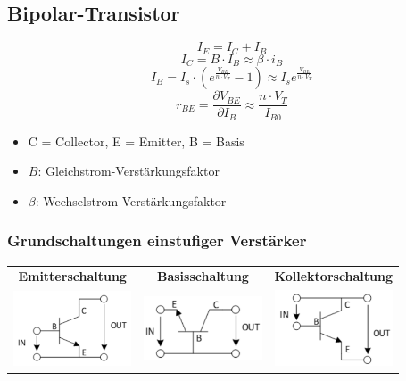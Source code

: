 \documentclass[margin=normal]{tex/hsrzf}
\begin{document}
\begin{multicols*}{2}
  
  
  \subsection{Bipolar-Transistor}
  $$I_E = I_C+I_B$$
  $$I_C = B\cdot I_B \approx \beta \cdot i_B$$
  $$I_B= I_s \cdot(e^{\frac{V_{BE}}{n \cdot V_T}}-1) \approx I_s e^{\frac{V_{BE}}{n \cdot V_T}}$$
  $$r_{BE} = \frac{\partial V_{BE}}{\partial I_B} \approx \frac{n \cdot V_T}{I_{B0}} $$
  {\tiny \begin{itemize}[leftmargin=*]
    \item C = Collector, E = Emitter, B = Basis
      \item $B$: Gleichstrom-Verstärkungsfaktor
      \item $\beta$: Wechselstrom-Verstärkungsfaktor
    \end{itemize}}

    \subsubsection{Grundschaltungen einstufiger Verstärker}
    
    \begin{tabular}{ccc}
      \textbf{Emitterschaltung}                                            &
      \textbf{Basisschaltung}                                              &
      \textbf{Kollektorschaltung}                                            \\
      \includegraphics[width = 3.5cm]{img/Transistor/Emitterschaltung.png} &
      \includegraphics[width = 3.5cm]{img/Transistor/Basisschaltung.png}   &
      \includegraphics[width = 3.5cm]{img/Transistor/Kollektorschaltung.png} \\
    \end{tabular}
    

\end{multicols*}
\end{document}
